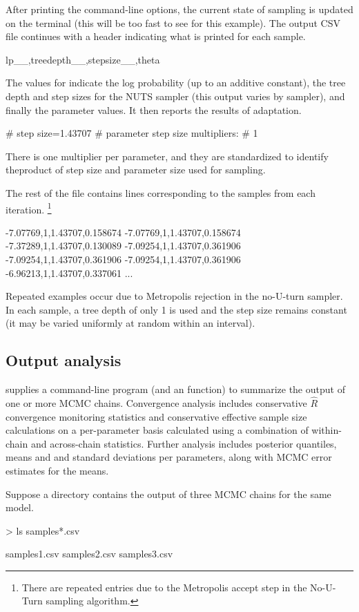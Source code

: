 \documentclass[article]{jss}
\begin{document}
After printing the command-line options, the current state of sampling
is updated on the terminal (this will be too fast to see for this
example).  The output CSV file continues with a header indicating what
is printed for each sample.
%
\begin{Code}
lp__,treedepth__,stepsize__,theta
\end{Code}
%
The values for  indicate the log probability (up to an
additive constant), the tree depth and step sizes for the NUTS sampler
(this output varies by sampler), and finally the parameter values.
It then reports the results of adaptation.
%
\begin{Code}
# step size=1.43707
# parameter step size multipliers:
# 1
\end{Code}
%
There is one multiplier per parameter, and they are standardized to
identify theproduct of step size and parameter size used for sampling.

The rest of the file contains lines corresponding to the
samples from each iteration.%
%
\footnote{There are repeated entries due to the Metropolis accept step
in the No-U-Turn sampling algorithm.}
%
%
\begin{Code}
-7.07769,1,1.43707,0.158674
-7.07769,1,1.43707,0.158674
-7.37289,1,1.43707,0.130089
-7.09254,1,1.43707,0.361906
-7.09254,1,1.43707,0.361906
-7.09254,1,1.43707,0.361906
-6.96213,1,1.43707,0.337061
...
\end{Code}
%
Repeated examples occur due to Metropolis rejection in the no-U-turn
sampler.  In each sample, a tree depth of only 1 is used and the step
size remains constant (it may be varied uniformly at random within an
interval).

\subsection{Output analysis}

 supplies a command-line program (and  an
  function) to summarize the output of one or
more MCMC chains.  Convergence analysis includes conservative
$\hat{R}$ convergence monitoring statistics and conservative effective
sample size calculations on a per-parameter basis calculated using a
combination of within-chain and across-chain statistics.  Further
analysis includes posterior quantiles, means and and standard
deviations per parameters, along with MCMC error estimates for the
means.

Suppose a directory contains the output of three MCMC chains for the
same model.
%
\begin{CodeChunk}
\begin{CodeInput}
> ls samples*.csv
\end{CodeInput}
\begin{CodeOutput}
samples1.csv	samples2.csv	samples3.csv
\end{CodeOutput}
\end{CodeChunk}
%
\end{document}
